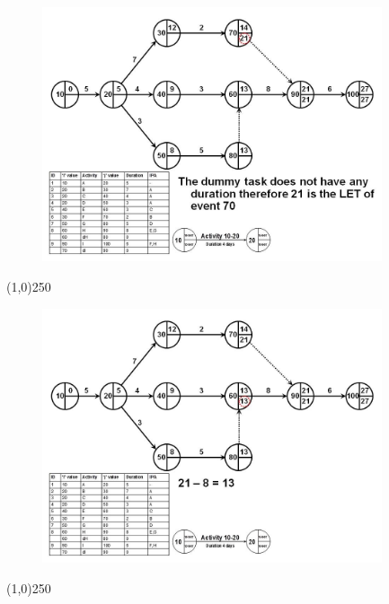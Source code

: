 \begin{frame}
\begin{figure}
	\centering
		\includegraphics[width = 10.0cm]{oldnotes/Slide113.jpg}
\end{figure}
\end{frame}
\begin{center}\line(1,0){250}\end{center}


\begin{frame}
\begin{figure}
	\centering
		\includegraphics[width = 10.0cm]{oldnotes/Slide114.jpg}
\end{figure}
\end{frame}
\begin{center}\line(1,0){250}\end{center}


